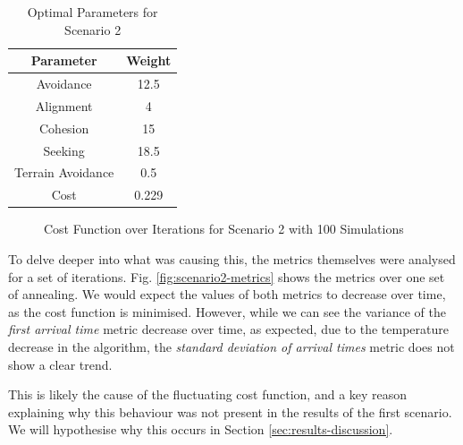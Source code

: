 \documentclass[12pt]{article}
\begin{document}
\begin{table}[ht]
    \centering
    \begin{tabular}{|c|c|}
        \hline
        Parameter & Weight \\
        \hline
        Avoidance & 12.5 \\
        \hline
        Alignment & 4 \\
        \hline
        Cohesion & 15 \\
        \hline
        Seeking & 18.5 \\
        \hline
        Terrain Avoidance & 0.5 \\
        \hline \hline
        Cost & 0.229 \\
        \hline
    \end{tabular}
    \caption{Optimal Parameters for Scenario 2}
    \label{tab:scenario2-parameters}
\end{table}

\begin{figure}[ht]
    \centering
    \caption{Cost Function over Iterations for Scenario 2 with 100 Simulations}
    \label{fig:scenario2-cost-100}
\end{figure}

To delve deeper into what was causing this, the metrics themselves were analysed for a set of iterations. Fig. \ref{fig:scenario2-metrics} shows the metrics over one set of annealing. We would expect the values of both metrics to decrease over time, as the cost function is minimised. However, while we can see the variance of the \emph{first arrival time} metric decrease over time, as expected, due to the temperature decrease in the algorithm, the \emph{standard deviation of arrival times} metric does not show a clear trend. 

This is likely the cause of the fluctuating cost function, and a key reason explaining why this behaviour was not present in the results of the first scenario. We will hypothesise why this occurs in Section \ref{sec:results-discussion}.
\end{document}
